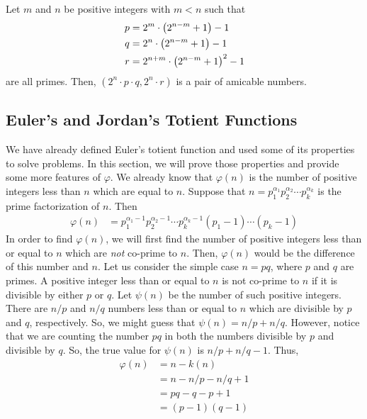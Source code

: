 \begin{theorem}
	Let $m$ and $n$ be positive integers with $m<n$ such that
	\begin{align*}
		p & = 2^m \cdot \left(2^{n-m}+1\right) - 1\\
		q & = 2^n \cdot  \left(2^{n-m}+1\right)  - 1\\
		r & = 2^{n+m}\cdot \left(2^{n-m}+1\right)^2  - 1
	\end{align*}
	are all primes. Then, $(2^n\cdot p \cdot q,  2^n\cdot r)$ is a pair of amicable numbers.
\end{theorem}


\subsection{Euler's and Jordan's Totient Functions}
	We have already defined Euler's totient function and used some of its properties to solve problems. In this section, we will prove those properties and provide some more features of $\varphi$. We already know that $\varphi(n)$ is the number of positive integers less than $n$ which are equal to $n$. Suppose that $n= p_1^{\alpha_1} p_2^{\alpha_2} \cdots p_k^{\alpha_k}$ is the prime factorization of $n$. Then
		\begin{align}
			\varphi(n) & = p_1^{\alpha_1-1} p_2^{\alpha_2-1} \cdots p_k^{\alpha_k-1}(p_1 -1) \cdots(p_k -1) \label{eq:totientformula}
		\end{align}
	In order to find $\varphi(n)$, we will first find the number of positive integers less than or equal to $n$ which are \textit{not} co-prime to $n$. Then, $\varphi(n)$ would be the difference of this number and $n$. Let us consider the simple case $n=pq$, where $p$ and $q$ are primes. A positive integer less than or equal to $n$ is not co-prime to $n$ if it is divisible by either $p$ or $q$. Let $\psi(n)$ be the number of such positive integers. There are $n/p$ and $n/q$ numbers less than or equal to $n$ which are divisible by $p$ and $q$, respectively. So, we might guess that $\psi(n)=n/p+n/q$. However, notice that we are counting the number $pq$ in both the numbers divisible by $p$ and divisible by $q$. So, the true value for $\psi(n)$ is $n/p+n/q-1$. Thus,
		\begin{align*}
			\varphi(n)
				&= n - k(n)\\
				&= n - n/p - n/q + 1\\
				&= pq - q - p +1\\
				&= (p-1)(q-1)
		\end{align*}
